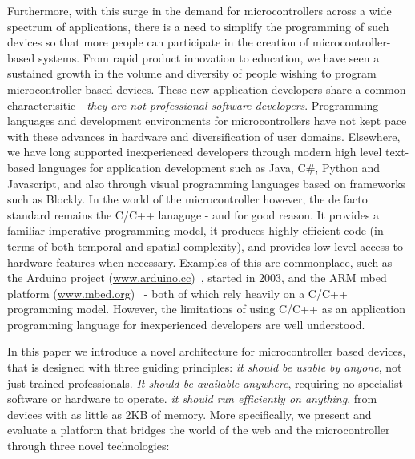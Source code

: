 Furthermore, with this surge in the demand for microcontrollers across a wide spectrum of applications, 
there is a need to simplify the programming of such devices so that more people can participate in 
the creation of microcontroller-based systems. From rapid product innovation to education,
we have seen a sustained growth in the volume and diversity of people wishing to program microcontroller based devices. 
These new application developers share a common characterisitic - \emph{they are not professional software developers}. 
Programming languages and development environments for microcontrollers have not kept pace with these advances 
in hardware and diversification of user domains. Elsewhere, we have long supported inexperienced developers through  
modern high level text-based languages for application development such as Java, C\#, Python and Javascript, and also 
through visual programming languages based on frameworks such as Blockly. In the world of the microcontroller however, the de facto standard remains the C/C++ lanaguge - and for good reason. 
It provides a familiar imperative programming model, it produces highly efficient code (in terms of both 
temporal and spatial complexity), and provides low level access to hardware features when necessary. Examples
of this are commonplace, such as the Arduino project (\url{www.arduino.cc})~\cite{buildingArduino2014},
started in 2003, and the ARM mbed platform (\url{www.mbed.org})~\cite{mbed} - both of which rely heavily on
a C/C++ programming model. However, the limitations of using C/C++ as an application programming language for 
inexperienced developers are well understood. 

In this paper we introduce a novel architecture for microcontroller based devices,
that is designed with three guiding principles: 
\emph{it should be usable by anyone}, not just trained professionals. 
\emph{It should be available anywhere}, requiring no specialist software or hardware to operate.
\emph{it should run efficiently on anything}, from devices with as little as 2KB of memory.
More specifically, we present and evaluate a platform that bridges the world of the web and the microcontroller through 
three novel technologies:

